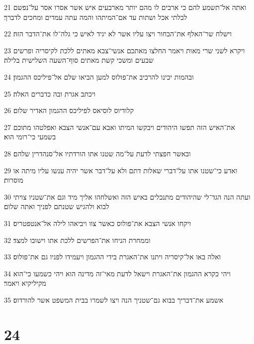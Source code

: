 \par 21 ואתה אל־תשמע להם כי ארבים לו מהם יותר מארבעים איש אשר אסרו אסר על־נפשם לבלתי אכל ושתות עד אם־המיתהו והמה עתה עמדים ומחכים לדברך׃
\par 22 וישלח שר־האלף את־הבחור ויצו עליו אשר לא יגיד לאיש כי גלה־לו את־הדבר הזה׃
\par 23 ויקרא לשני שרי מאות ויאמר החלצו מאתכם אנשי־צבא מאתים ללכת לקיסריה ופרשים שבעים ומשכי קשת מאתים סוף־השעה השלישית בלילה׃
\par 24 ובהמות יכינו להרכיב את־פולוס למען הביאו שלם אל־פיליכס ההגמון׃
\par 25 ויכתב אגרת ובה כדברים האלה׃
\par 26 קלודיוס לוסיאס לפיליכס ההגמון האדיר שלום׃
\par 27 את־האיש הזה תפשו היהודים ויבקשו המיתו ואבא עם־אנשי הצבא ואפלטהו מתוכם בשמעי כי־רומי הוא׃
\par 28 ובאשר חפצתי לדעת על־מה שטנו אתו הורדתיו אל־סנהדרין שלהם׃
\par 29 ואדע כי־שטנו אתו על־דברי שאלות דתם ולא על־דבר אשר יהיה ענשו עליו מיתה או מוסרות׃
\par 30 ועתה הנה הגד־לי שהיהודים מתנכלים באיש הזה ואשלחהו אליך מיד וגם את־שטניו צויתי לבוא ולהגיש שטנתם לפניך ואתה שלום׃
\par 31 ויקחו אנשי הצבא את־פולוס כאשר צוו ויביאהו לילה אל־אנטפטריס׃
\par 32 וממחרת הניחו את־הפרשים ללכת אתו וישובו למצד׃
\par 33 ואלה באו אל־קיסריה ויתנו את־האגרת בידי ההגמון ויעמידו לפניו גם את־פולוס׃
\par 34 ויהי כקרא ההגמון את־האגרת וישאל לדעת מאי־זה מדינה הוא ויהי כשמעו כי־הוא מקיליקיא ויאמר׃
\par 35 אשמע את־דבריך בבוא גם־שטניך הנה ויצו לשמרו בבית המשפט אשר להורדוס׃

\chapter{24}

